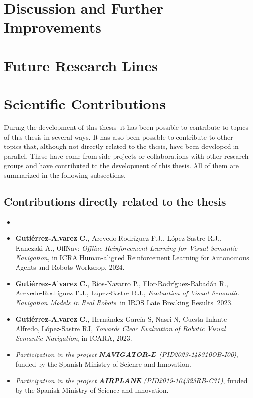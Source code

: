 \section{Discussion and Further Improvements}\label{sec:discussion-and-further-improvements}


\section{Future Research Lines}\label{sec:future-work}


\section{Scientific Contributions}\label{sec:final-remarks}

During the development of this thesis, it has been possible to contribute to topics of this thesis in several ways.
It has also been possible to contribute to other topics that, although not directly related to the thesis, have been developed in parallel.
These have come from side projects or collaborations with other research groups and have contributed to the development of this thesis.
All of them are summarized in the following subsections.

\subsection{Contributions directly related to the thesis}\label{subsec:contributions-directly-related-to-the-thesis}

\begin{itemize}
    \item {}
    \item \textbf{Gutiérrez-Alvarez C.}, Acevedo-Rodríguez F.J., López-Sastre R.J., Kanezaki A., OffNav: \textit{Offline Reinforcement Learning for Visual Semantic Navigation}, in ICRA Human-aligned Reinforcement Learning for Autonomous Agents and Robots Workshop, 2024.
    \item \textbf{Gutiérrez-Alvarez C.}, Ríos-Navarro P., Flor-Rodríguez-Rabadán R., Acevedo-Rodríguez F.J., López-Sastre R.J., \textit{Evaluation of Visual Semantic Navigation Models in Real Robots}, in IROS Late Breaking Results, 2023.
    \item \textbf{Gutiérrez-Alvarez C.}, Hernández García S, Nasri N, Cuesta-Infante Alfredo, López-Sastre RJ, \textit{Towards Clear Evaluation of Robotic Visual Semantic Navigation}, in ICARA, 2023.
    \item \textit{Participation in the project \textbf{NAVIGATOR-D} (PID2023-148310OB-I00)}, funded by the Spanish Ministry of Science and Innovation.
    \item \textit{Participation in the project \textbf{AIRPLANE} (PID2019-104323RB-C31)}, funded by the Spanish Ministry of Science and Innovation.
\end{itemize}

